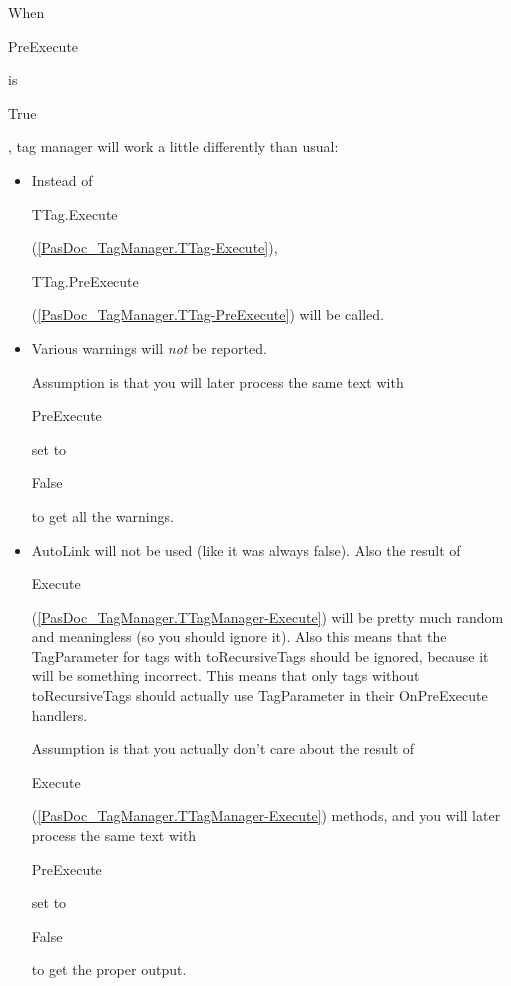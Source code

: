 \documentclass{report}
\newif\ifpdf
\begin{document}
\begin{list}{}
\begin{flushleft}
\ifpdf
\end{flushleft}
\fi


\par When \begin{ttfamily}PreExecute\end{ttfamily} is \begin{ttfamily}True\end{ttfamily}, tag manager will work a little differently than usual:

\begin{itemize}
\item Instead of \begin{ttfamily}TTag.Execute\end{ttfamily}(\ref{PasDoc_TagManager.TTag-Execute}), \begin{ttfamily}TTag.PreExecute\end{ttfamily}(\ref{PasDoc_TagManager.TTag-PreExecute}) will be called.
\item Various warnings will \textit{not} be reported.

Assumption is that you will later process the same text with \begin{ttfamily}PreExecute\end{ttfamily} set to \begin{ttfamily}False\end{ttfamily} to get all the warnings.
\item AutoLink will not be used (like it was always false). Also the result of \begin{ttfamily}Execute\end{ttfamily}(\ref{PasDoc_TagManager.TTagManager-Execute}) will be pretty much random and meaningless (so you should ignore it). Also this means that the TagParameter for tags with toRecursiveTags should be ignored, because it will be something incorrect. This means that only tags without toRecursiveTags should actually use TagParameter in their OnPreExecute handlers.

Assumption is that you actually don't care about the result of \begin{ttfamily}Execute\end{ttfamily}(\ref{PasDoc_TagManager.TTagManager-Execute}) methods, and you will later process the same text with \begin{ttfamily}PreExecute\end{ttfamily} set to \begin{ttfamily}False\end{ttfamily} to get the proper output.


\end{itemize}
\end{list}
\end{document}
